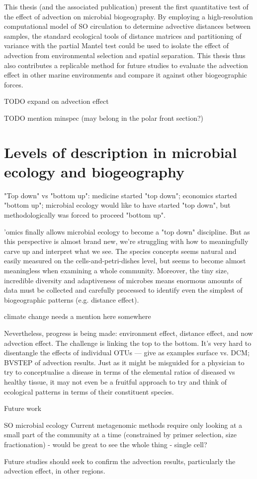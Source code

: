 This thesis (and the associated publication) present the first quantitative test of the effect of advection on microbial biogeography.
By employing a high-resolution computational model of \ac{SO} circulation to determine advective distances between samples, the standard ecological tools of distance matrices and partitioning of variance with the partial Mantel test could be used to isolate the effect of advection from environmental selection and spatial separation.
This thesis thus also contributes a replicable method for future studies to evaluate the advection effect in other marine environments and compare it against other biogeographic forces.

TODO expand on advection effect

TODO mention minspec (may belong in the polar front section?)

\section{Levels of description in microbial ecology and biogeography}

"Top down" vs "bottom up": medicine started "top down"; economics started "bottom up"; microbial ecology would like to have started "top down", but methodologically was forced to proceed "bottom up".

'omics finally allows microbial ecology to become a "top down" discipline. But as this perspective is almost brand new, we're struggling with how to meaningfully carve up and interpret what we see. The species concepts seems natural and easily measured on the cells-and-petri-dishes level, but seems to become almost meaningless when examining a whole community. Moreover, the tiny size, incredible diversity and adaptiveness of microbes means enormous amounts of data must be collected and carefully processed to identify even the simplest of biogeographic patterns (e.g. distance effect).

climate change needs a mention here somewhere

Nevertheless, progress is being made: environment effect, distance effect, and now advection effect. The challenge is linking the top to the bottom. It's very hard to disentangle the effects of individual OTUs — give as examples surface vs. DCM; BVSTEP of advection results. Just as it might be misguided for a physician to try to conceptualise a disease in terms of the elemental ratios of diseased vs healthy tissue, it may not even be a fruitful approach to try and think of ecological patterns in terms of their constituent species.

Future work

SO microbial ecology
Current metagenomic methods require only looking at a small part of the community at a time (constrained by primer selection, size fractionation) - would be great to see the whole thing - single cell?

Future studies should seek to confirm the advection results, particularly the advection effect, in other regions.
